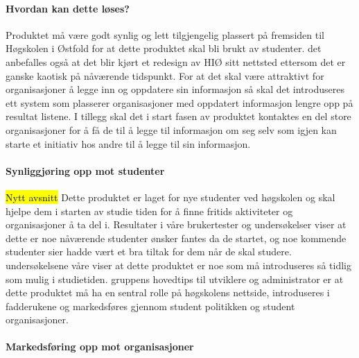 \paragraph{Hvordan kan dette løses?}

Produktet må være godt synlig og lett tilgjengelig plassert på fremsiden til Høgskolen i Østfold for at dette produktet skal bli brukt av studenter. det anbefalles også at det blir kjørt et redesign av HIØ sitt nettsted ettersom det er ganske kaotisk på nåværende tidspunkt. For at det skal være attraktivt for organisasjoner å legge inn og oppdatere sin informasjon så skal det introduseres ett system som plasserer organisasjoner med oppdatert informasjon lengre opp på resultat listene. I tillegg skal det i start fasen av produktet kontaktes en del store organisasjoner for å få de til å legge til informasjon om seg selv som igjen kan starte et initiativ hos andre til å legge til sin informasjon. 


\paragraph{Synliggjøring opp mot studenter}

\hl{Nytt avsnitt}
Dette produktet er laget for nye studenter ved høgskolen og skal hjelpe dem i starten av studie tiden for å finne fritids aktiviteter og organisasjoner å ta del i. Resultater i våre brukertester og undersøkelser viser at dette er noe nåværende studenter ønsker fantes da de startet, og noe kommende studenter sier hadde vært et bra tiltak for dem når de skal studere. 
undersøkelsene våre viser at dette produktet er noe som må introduseres så tidlig som mulig i studietiden. gruppens hovedtips til utviklere og administrator er at dette produktet må ha en sentral rolle på høgskolens nettside, introduseres i fadderukene og markedsføres gjennom student politikken og student organisasjoner.

\paragraph{Markedsføring opp mot organisasjoner}

